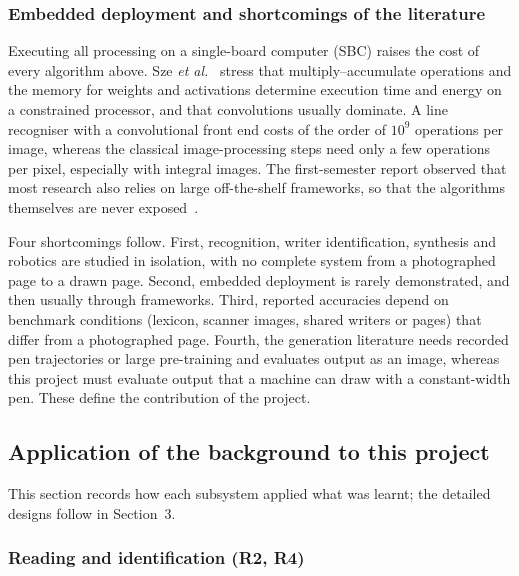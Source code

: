 \subsubsection{Embedded deployment and shortcomings of the literature}
\label{sec:lit-embedded}

Executing all processing on a single-board computer (SBC) raises the cost of every algorithm above. Sze \emph{et al.}~\cite{sze2017} stress that multiply--accumulate operations and the memory for weights and activations determine execution time and energy on a constrained processor, and that convolutions usually dominate. A line recogniser with a convolutional front end costs of the order of $10^{9}$ operations per image, whereas the classical image-processing steps need only a few operations per pixel, especially with integral images. The first-semester report observed that most research also relies on large off-the-shelf frameworks, so that the algorithms themselves are never exposed~\cite{chen2023}.

Four shortcomings follow. First, recognition, writer identification, synthesis and robotics are studied in isolation, with no complete system from a photographed page to a drawn page. Second, embedded deployment is rarely demonstrated, and then usually through frameworks. Third, reported accuracies depend on benchmark conditions (lexicon, scanner images, shared writers or pages) that differ from a photographed page. Fourth, the generation literature needs recorded pen trajectories or large pre-training and evaluates output as an image, whereas this project must evaluate output that a machine can draw with a constant-width pen. These define the contribution of the project.

\subsection{Application of the background to this project}
\label{sec:lit-application}

This section records how each subsystem applied what was learnt; the detailed designs follow in Section~3.

\subsubsection{Reading and identification (R2, R4)}


